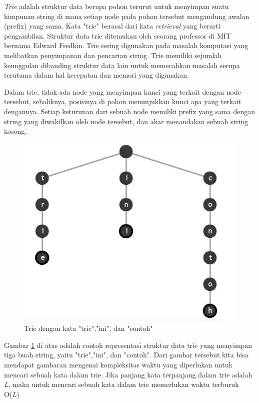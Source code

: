 \textit{Trie} adalah struktur data berupa pohon terurut untuk menyimpan suatu himpunan string di mana setiap node pada pohon tersebut mengandung awalan (prefix) yang sama\cite{najogie:10:trie}. Kata "trie" berasal dari kata \textit{retrieval} yang berarti pengambilan. Struktur data trie ditemukan oleh seorang professor di MIT bernama Edward Fredkin. Trie sering digunakan pada masalah komputasi yang melibatkan penyimpanan dan pencarian string. Trie memiliki sejumlah keunggulan dibanding struktur data lain untuk memecahkan masalah serupa terutama dalam hal kecepatan dan memori yang digunakan.

Dalam trie, tidak ada node yang menyimpan kunci yang terkait dengan node tersebut, sebaliknya, posisinya di pohon menunjukkan kunci apa yang terkait dengannya. Setiap keturunan dari sebuah node memiliki prefix yang sama dengan string yang diwakilkan oleh node tersebut, dan akar menandakan sebuah string kosong.

\begin{figure}[H]
\centering
\includegraphics[scale=1]{Gambar/contoh-trie-1}
\caption[Trie dengan kata "trie","ini", dan "contoh"]{Trie dengan kata "trie","ini", dan "contoh"\cite{najogie:10:trie}} 
\label{contoh-trie-1}
\end{figure}

Gambar \ref{contoh-trie-1} di atas adalah contoh representasi struktur data trie yang menyimpan tiga buah string, yaitu "trie","ini", dan "contoh". Dari gambar tersebut kita bisa mendapat gambaran mengenai kompleksitas waktu yang diperlukan untuk mencari sebuah kata dalam trie. Jika panjang kata terpanjang dalam trie adalah \textit{L}, maka untuk mencari sebuah kata dalam trie memerlukan waktu terburuk O(\textit{L})

